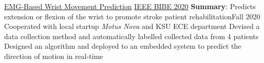 \resumeSubheading
{\href{https://doi.org/10.1109/BIBE50027.2020.00172}{EMG-Based Wrist Movement
        Prediction}}
{\href{https://ieeexplore.ieee.org/servlet/opac?punumber=9287816}{IEEE BIBE 2020}}
{\textbf{Summary}: Predicts extension or flexion of the wrist to promote stroke patient rehabilitation}{Fall 2020}
\resumeItemListStart
\resumeItem
{Cooperated with local startup \textit{Motus Nova} and KSU ECE department}
\resumeItem
{Devised a data collection method and automatically labelled collected data from
    4 patients}
\resumeItem
{Designed an algorithm and deployed to an embedded system to predict the direction of motion in real-time}
\resumeItemListEnd